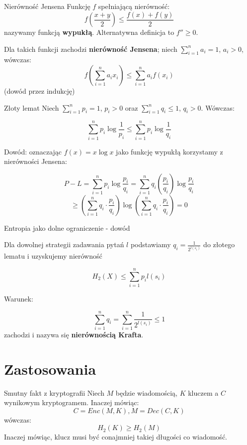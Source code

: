 \documentclass{beamer}
\begin{document}
\begin{frame}{Nierówność Jensena}
Funkcję $f$ spełniającą nierówność:
$$
f\left(\frac{x + y}{2}\right) \leq \frac{f(x) + f(y)}{2}
$$
nazywamy funkcją \textbf{wypukłą}. Alternatywna definicja to $f'' \geq 0$.
\newline

Dla takich funkcji zachodzi \textbf{nierówność Jensena};
niech $\sum_{i=1}^{n} a_i = 1$, $a_i > 0$, wówczas:
$$
f\left(\sum_{i=1}^{n} a_i x_i\right) \leq \sum_{i=1}^{n} a_i f(x_i)
$$
(dowód przez indukcję)
\end{frame}

\begin{frame}{Złoty lemat}
Niech $\sum_{i=1}^{n} p_i = 1$, $p_i > 0$ oraz $\sum_{i=1}^{n} q_i \leq 1$, $q_i > 0$. Wówczas:

$$
\sum_{i=1}^{n} p_i \log{\frac{1}{p_i}} \leq \sum_{i=1}^{n} p_i \log{\frac{1}{q_i}}
$$

Dowód: oznaczając $f(x) = x \log{x}$ jako funkcję wypukłą korzystamy
z nierówności Jensena:

$$
P - L = \sum_{i=1}^{n} p_i \log{\frac{p_i}{q_i}}
= \sum_{i=1}^{n} q_i \left(\frac{p_i}{q_i}\right) \log{\frac{p_i}{q_i}}
$$
$$
\geq \left( \sum_{i=1}^n q_i \cdot \frac{p_i}{q_i} \right) \log{\left( \sum_{i=1}^n q_i \cdot \frac{p_i}{q_i} \right)}
= 0
$$

\end{frame}


\begin{frame}{Entropia jako dolne ograniczenie - dowód}

Dla dowolnej strategii zadawania pytań $l$ podstawiamy
$q_i = \frac{1}{2^{l(s_i)}}$ do złotego lematu i uzyskujemy nierówność

$$
H_2(X) \leq \sum_{i=1}^{n} p_i l(s_i)
$$

Warunek:

$$
\sum_{i=1}^n q_i = \sum_{i=1}^n \frac{1}{2^{l(s_i)}} \leq 1
$$
zachodzi i nazywa się \textbf{nierównością Krafta}.
\end{frame}

\section{Zastosowania}

\begin{frame}{Smutny fakt z kryptografii}
Niech $M$ będzie wiadomością, $K$ kluczem a $C$ wynikowym kryptogramem. Inaczej mówiąc:
$$
C = Enc(M, K), M = Dec(C, K)
$$
wówczas:
$$
H_2(K) \geq H_2(M)
$$
Inaczej mówiąc, klucz musi być conajmniej takiej długości co wiadomość.
\end{frame}
\end{document}
